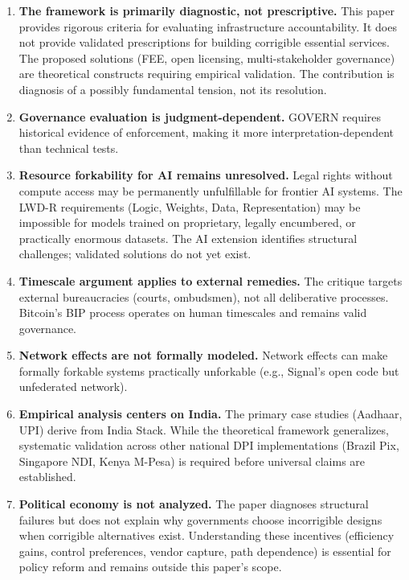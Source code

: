 \documentclass{article}
\begin{document}
\begin{enumerate}
    \item \textbf{The framework is primarily diagnostic, not prescriptive.} This paper provides rigorous criteria for evaluating infrastructure accountability. It does not provide validated prescriptions for building corrigible essential services. The proposed solutions (FEE, open licensing, multi-stakeholder governance) are theoretical constructs requiring empirical validation. The contribution is diagnosis of a possibly fundamental tension, not its resolution.

    \item \textbf{Governance evaluation is judgment-dependent.} GOVERN requires historical evidence of enforcement, making it more interpretation-dependent than technical tests.

    \item \textbf{Resource forkability for AI remains unresolved.} Legal rights without compute access may be permanently unfulfillable for frontier AI systems. The LWD-R requirements (Logic, Weights, Data, Representation) may be impossible for models trained on proprietary, legally encumbered, or practically enormous datasets. The AI extension identifies structural challenges; validated solutions do not yet exist.

    \item \textbf{Timescale argument applies to external remedies.} The critique targets external bureaucracies (courts, ombudsmen), not all deliberative processes. Bitcoin's BIP process operates on human timescales and remains valid governance.

    \item \textbf{Network effects are not formally modeled.} Network effects can make formally forkable systems practically unforkable (e.g., Signal's open code but unfederated network).

    \item \textbf{Empirical analysis centers on India.} The primary case studies (Aadhaar, UPI) derive from India Stack. While the theoretical framework generalizes, systematic validation across other national DPI implementations (Brazil Pix, Singapore NDI, Kenya M-Pesa) is required before universal claims are established.

    \item \textbf{Political economy is not analyzed.} The paper diagnoses structural failures but does not explain why governments choose incorrigible designs when corrigible alternatives exist. Understanding these incentives (efficiency gains, control preferences, vendor capture, path dependence) is essential for policy reform and remains outside this paper's scope.


\end{enumerate}
\end{document}
